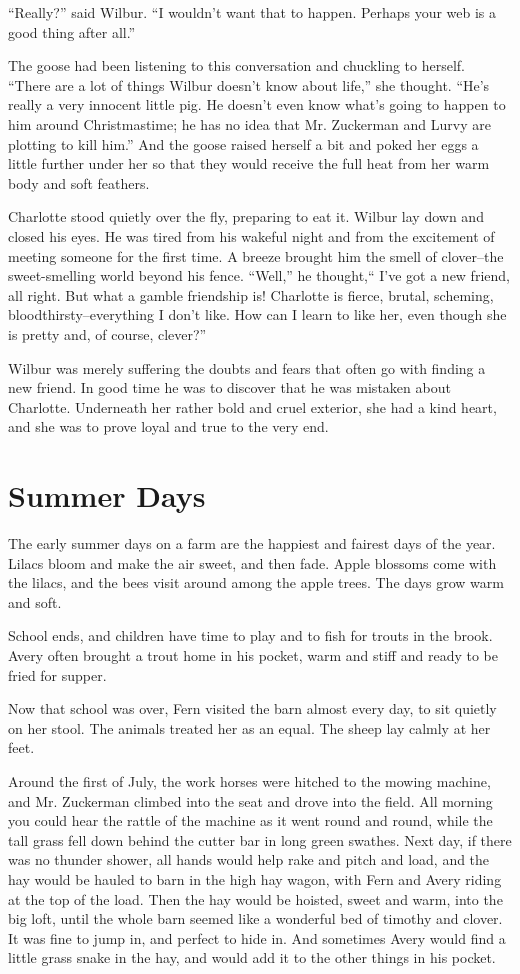 \documentclass[a4paper, oneside]{book}
\begin{document}
 ``Really?'' said Wilbur. ``I wouldn't want that to happen. Perhaps
your web is a good thing after all.''

 The goose had been listening to this conversation and chuckling
to herself. ``There are a lot of things Wilbur doesn't know about
life,'' she thought. ``He's really a very innocent little pig. He doesn't
even know what's going to happen to him around Christmastime;
he has no idea that Mr. Zuckerman and Lurvy are plotting to kill
him.'' And the goose raised herself a bit and poked her eggs a little
further under her so that they would receive the full heat from her
warm body and soft feathers.

 Charlotte stood quietly over the fly, preparing to eat it. Wilbur lay
down and closed his eyes. He was tired from his wakeful night and
from the excitement of meeting someone for the first time. A
breeze brought him the smell of clover--the sweet-smelling world
beyond his fence. ``Well,'' he thought,`` I've got a new friend, all
right. But what a gamble friendship is! Charlotte is fierce, brutal,
scheming, bloodthirsty--everything I don't like. How can I learn to
like her, even though she is pretty and, of course, clever?''

 Wilbur was merely suffering the doubts and fears that often go
with finding a new friend. In good time he was to discover that he
was mistaken about Charlotte. Underneath her rather bold and
cruel exterior, she had a kind heart, and she was to prove loyal and
true to the very end. 

  \chapter{Summer Days}
 The early summer days on a farm are the happiest and fairest
days of the year. Lilacs bloom and make the air sweet, and then
fade. Apple blossoms come with the lilacs, and the bees visit
around among the apple trees. The days grow warm and soft.

School ends, and children have time to play and to fish for trouts in
the brook. Avery often brought a trout home in his pocket, warm
and stiff and ready to be fried for supper.

 Now that school was over, Fern visited the barn almost every day,
to sit quietly on her stool. The animals treated her as an equal. The
sheep lay calmly at her feet. 

 Around the first of July, the work horses were hitched to the
mowing machine, and Mr. Zuckerman climbed into the seat and 
drove into the field. All morning you could hear the rattle of the
machine as it went round and round, while the tall grass fell down
behind the cutter bar in long green swathes. Next day, if there was
no thunder shower, all hands would help rake and pitch and load,
and the hay would be hauled to barn in the high hay wagon, with
Fern and Avery riding at the top of the load. Then the hay would be
hoisted, sweet and warm, into the big loft, until the whole barn
seemed like a wonderful bed of timothy and clover. It was fine to
jump in, and perfect to hide in. And sometimes Avery would find a
little grass snake in the hay, and would add it to the other things in
his pocket. 
\end{document}
